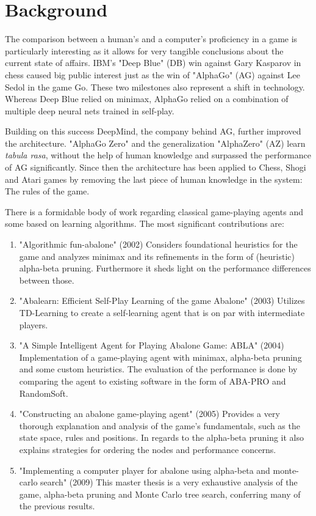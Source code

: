 \documentclass{../lib/llncs}
\begin{document}
\section{Background}
The comparison between a human's and a computer's proficiency in a game is particularly interesting as it allows for very tangible conclusions about the current state of affairs. IBM's "Deep Blue" (DB) win against Gary Kasparov \cite{higgins_brief_2017} in chess caused big public interest just as the win of "AlphaGo" (AG) against Lee Sedol \cite{deepmind_match_nodate} in the game Go. These two milestones also represent a shift in technology. Whereas Deep Blue relied on minimax, AlphaGo relied on a combination of multiple deep neural nets trained in self-play. \cite{silver_mastering_2017}

Building on this success DeepMind, the company behind AG, further improved the architecture. "AlphaGo Zero" and the generalization "AlphaZero" (AZ) learn \textit{tabula rasa}, without the help of human knowledge and surpassed the performance of AG significantly. Since then the architecture has been applied to Chess, Shogi and Atari games by removing the last piece of human knowledge in the system: The rules of the game. \cite{schrittwieser_mastering_2020}

There is a formidable body of work regarding classical game-playing agents and some based on learning algorithms. The most significant contributions are:

\begin{enumerate}
    \item "Algorithmic fun-abalone" (2002) Considers foundational heuristics for the game and analyzes minimax and its refinements in the form of (heuristic) alpha-beta pruning. Furthermore it sheds light on the performance differences between those. \cite{aichholzer_algorithmic_2002}
    \item "Abalearn: Efficient Self-Play Learning of the game Abalone" (2003) Utilizes TD-Learning to create a self-learning agent that is on par with intermediate players. \cite{campos_abalearn_2003}
    \item "A Simple Intelligent Agent for Playing Abalone Game: ABLA" (2004) Implementation of a game-playing agent with minimax, alpha-beta pruning and some custom heuristics. The evaluation of the performance is done by comparing the agent to existing software in the form of ABA-PRO and RandomSoft.\cite{ozcan_simple_2004}
    \item "Constructing an abalone game-playing agent" (2005) Provides a very thorough explanation and analysis of the game's fundamentals, such as the state space, rules and positions. In regards to the alpha-beta pruning it also explains strategies for ordering the nodes and performance concerns. \cite{lemmens_constructing_2005}
    \item "Implementing a computer player for abalone using alpha-beta and monte-carlo search" (2009) This master thesis is a very exhaustive analysis of the game, alpha-beta pruning and Monte Carlo tree search, conferring many of the previous results. \cite{chorus_implementing_2009}
\end{enumerate}
\end{document}
